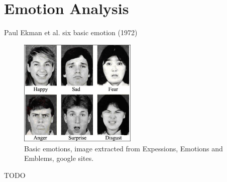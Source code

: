 
\section{Emotion Analysis}
\label{sec:emotion_analysis}

Paul Ekman et al. six basic emotion (1972) \cite{StevenEmotion2011Classification}

\begin{figure}[!htp]
  \center
  \includegraphics[width=0.5\textwidth]{figures/emotions_ekman}
  \caption{Basic emotions, image extracted from Expessions, Emotions and Emblems, google sites.}
  \label{fig:ekman_basic_emotions}
\end{figure}

TODO